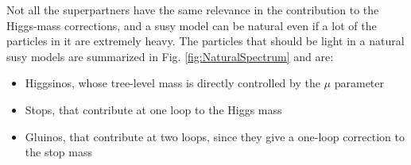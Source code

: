 Not all the superpartners have the same relevance in the contribution to the Higgs-mass corrections, and a \gls{susy} model can be natural even if a lot of the particles in it are extremely heavy. The particles that should be light in a natural \gls{susy} models are summarized in Fig. \ref{fig:NaturalSpectrum} and are:
\begin{itemize}
\item Higgsinos, whose tree-level mass is directly controlled by the $\mu$ parameter
\item Stops, that contribute at one loop to the Higgs mass
\item Gluinos, that contribute at two loops, since they give a one-loop correction to the stop mass
\end{itemize}





